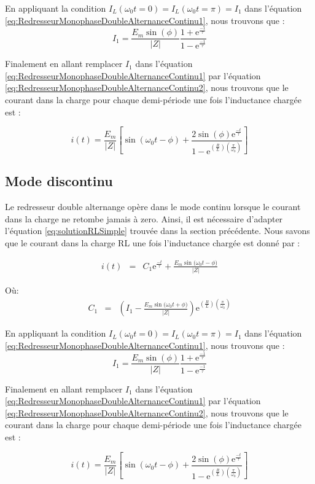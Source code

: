 En appliquant la condition $I_L(\omega_0 t = 0)=I_L(\omega_0 t=\pi)=I_1$ dans l'équation \ref{eq:RedresseurMonophaseDoubleAlternanceContinu1}, nous trouvons que :
\begin{equation}
\label{eq:RedresseurMonophaseDoubleAlternanceContinu2}
	I_1 = \frac{E_m\sin{(\phi)}}{|Z|}  \frac{1 + \mbox{e}^{\frac{-1}{\tau}}}{1 - \mbox{e}^{\frac{-1}{\tau}}}
\end{equation}

Finalement en allant remplacer $I_1$ dans l'équation \ref{eq:RedresseurMonophaseDoubleAlternanceContinu1} par l'équation \ref{eq:RedresseurMonophaseDoubleAlternanceContinu2}, nous trouvons que le courant dans la charge pour chaque demi-période une fois l'inductance chargée est :

\begin{equation}
	i(t) = \frac{E_m}{|Z|}\left[\sin{(\omega_0 t - \phi)} + \frac{2\sin(\phi) \mbox{e}^{\frac{-t}{\tau}}}{1-\mbox{e}^{\left(\frac{R}{L}\right)\left(\frac{\pi}{\omega_0}\right)}} \right] 
\end{equation}

\subsection{Mode discontinu}
Le redresseur double alternange opère dans le mode continu lorsque le courant dans la charge ne retombe jamais à zero. Ainsi, il est nécessaire d'adapter l'équation \ref{eq:solutionRLSimple} trouvée dans la section précédente. Nous savons que le courant dans la charge RL une fois l'inductance chargée est donné par :

\begin{eqnarray}
\label{eq:RedresseurMonophaseDoubleAlternanceContinu1}
i(t) &=& C_1\mbox{e}^{\frac{-t}{\tau}} + \frac{E_m\sin{(\omega_0 t - \phi})}{|Z|}
\end{eqnarray}

Où:
\begin{eqnarray}
C_1 &=& \left( I_1 - \frac{E_m\sin{(\omega_0 t + \phi})}{|Z|}\right)\mbox{e}^{\left(\frac{R}{L}\right)\left(\frac{\pi}{\omega_0}\right)}
\end{eqnarray}

En appliquant la condition $I_L(\omega_0 t = 0)=I_L(\omega_0 t=\pi)=I_1$ dans l'équation \ref{eq:RedresseurMonophaseDoubleAlternanceContinu1}, nous trouvons que :
\begin{equation}
\label{eq:RedresseurMonophaseDoubleAlternanceContinu2}
	I_1 = \frac{E_m\sin{(\phi)}}{|Z|}  \frac{1 + \mbox{e}^{\frac{-1}{\tau}}}{1 - \mbox{e}^{\frac{-1}{\tau}}}
\end{equation}

Finalement en allant remplacer $I_1$ dans l'équation \ref{eq:RedresseurMonophaseDoubleAlternanceContinu1} par l'équation \ref{eq:RedresseurMonophaseDoubleAlternanceContinu2}, nous trouvons que le courant dans la charge pour chaque demi-période une fois l'inductance chargée est :

\begin{equation}
	i(t) = \frac{E_m}{|Z|}\left[\sin{(\omega_0 t - \phi)} + \frac{2\sin(\phi) \mbox{e}^{\frac{-t}{\tau}}}{1-\mbox{e}^{\left(\frac{R}{L}\right)\left(\frac{\pi}{\omega_0}\right)}} \right] 
\end{equation}